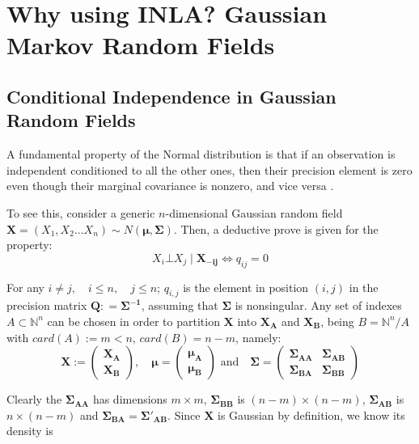 \documentclass[openany]{book}
\begin{document}
\section[GMRFs]{Why using INLA? Gaussian Markov Random Fields}\label{section:GMRFs}

\subsection{Conditional Independence in Gaussian Random Fields}\label{par:GRFs}
A fundamental property of the Normal distribution is that if an observation is independent conditioned to all the other ones, then their precision element is zero even though their marginal covariance is nonzero, and vice versa \cite{GMRFs}.

To see this, consider a generic $n$-dimensional Gaussian random field $\mathbf{X} = (X_1, X_2 .. . X_n) \sim N(\mathbf{\mu}, \mathbf{\Sigma})$. Then, a deductive prove is given for the property:
\begin{equation}
		X_i \bot X_j \mid \mathbf{X_{-ij}} \iff q_{ij} = 0
		\label{eq:theorem1}
\end{equation}

For any $i \neq j,  \quad i \leq n, \quad j\leq n$; $q_{i,j}$ is the element in position $(i,j)$ in the precision matrix $\mathbf{Q}: = \mathbf{\Sigma^{-1}}$, assuming that $\mathbf{\Sigma}$ is nonsingular. Any set of indexes $A \subset \mathbb{N}^n$ can be chosen in order to partition $\mathbf{X}$ into $\mathbf{X_A}$ and $\mathbf{X_B}$, being $B = \mathbb{N}^n / A$ with $card(A) := m<n, \, card(B) = n-m$, namely:
	$$
	\mathbf{X} := \left( \begin{array}{l} \mathbf{X_A} \\ \mathbf{X_B}
		\end{array}
	\right)  , \quad 
		\mathbf{\mu} = \left( \begin{array}{l} \mathbf{\mu_A} \\ \mathbf{\mu_B}
	\end{array}
	\right)
	 \,\, \text{and} \quad 
	\mathbf{\Sigma} = \left( \begin{array}{ll} \mathbf{\Sigma_{AA}} & \mathbf{\Sigma_{AB}}
		 \\ \mathbf{\Sigma_{BA}} & \mathbf{\Sigma_{BB}}
	\end{array}
	\right)
	$$
    
Clearly the $\mathbf{\Sigma_{AA}}$ has dimensions $m \times m$, $\mathbf{\Sigma_{BB}}$ is $(n-m) \times (n-m)$,	$\mathbf{\Sigma_{AB}}$ is $n \times (n-m)$ and $\mathbf{\Sigma_{BA}} = \mathbf{\Sigma'_{AB}}$. 
Since $\mathbf{X}$ is Gaussian by definition, we know its density is
\end{document}
